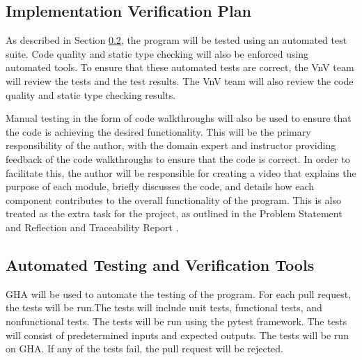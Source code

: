 \documentclass[12pt, titlepage]{article}
\begin{document}
\subsection{Implementation Verification Plan}

As described in Section \ref{sec:AutomatedTesting}, the \progname{} program will
be tested using an automated test suite. Code quality and static type checking
will also be enforced using automated tools. To ensure that these automated
tests are correct, the VnV team will review the tests and the test results. The
VnV team will also review the code quality and static type checking results.

Manual testing in the form of code walkthroughs will also be used to ensure that
the code is achieving the desired functionality. This will be the primary
responsibility of the author, with the domain expert and instructor providing
feedback of the code walkthroughs to ensure that the code is correct. In order
to facilitate this, the author will be responsible for creating a video that
explains the purpose of each module, briefly discusses the code, and details
how each component contributes to the overall functionality of the program.
This is also treated as the extra task for the project, as outlined in the
Problem Statement \citep{ProblemStatement} and Reflection and Traceability
Report \citep{ReflectAndTrace}.




\subsection{Automated Testing and Verification Tools}
\label{sec:AutomatedTesting}

GHA will be used to automate the testing of the \progname{} program. For
each pull request, the tests will be run.The tests will include unit tests,
functional tests, and nonfunctional tests. The tests will be run using the
pytest framework. The tests will consist of predetermined inputs and expected
outputs. The tests will be run on GHA. If any of the tests fail, the
pull request will be rejected.
\end{document}
